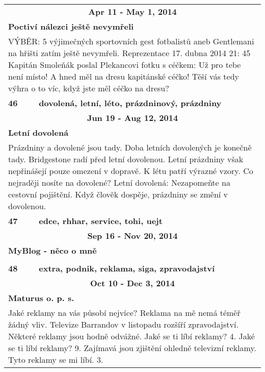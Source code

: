 \begin{tabularx}{\linewidth}{l l}
                \multicolumn{2}{c}{\bf Apr 11 - May 1, 2014} \\
                \multicolumn{2}{p{\linewidth}}{\bf Poctiví nálezci ještě nevymřeli} \\
                \multicolumn{2}{p{\linewidth}}{VÝBĚR: 5 výjimečných sportovních gest fotbalistů aneb Gentlemani na hřišti zatím ještě nevymřeli. Reprezentace 17. dubna 2014 21: 45 Kapitán Smoleňák poslal Plekancovi fotku s céčkem: Už pro tebe není místo! A hned měl na dresu kapitánské céčko! Těší vás tedy výhra o to víc, když jste měl céčko na dresu?} \\ \midrule
                [1.5pt]

            \bf 46 & \bf dovolená, letní, léto, prázdninový, prázdniny \\ \midrule
            
                \multicolumn{2}{c}{\bf Jun 19 - Aug 12, 2014} \\
                \multicolumn{2}{p{\linewidth}}{\bf Letní dovolená} \\
                \multicolumn{2}{p{\linewidth}}{Prázdniny a dovolené jsou tady. Doba letních dovolených je konečně tady. Bridgestone radí před letní dovolenou. Letní prázdniny však nepřinášejí pouze omezení v dopravě. K létu patří výrazné vzory. Co nejraději nosíte na dovolené? Letní dovolená: Nezapomeňte na cestovní pojištění. Když člověk dospěje, prázdniny se změní v dovolenou.} \\ \midrule
                [1.5pt]

            \bf 47 & \bf edce, rhhar, service, tohi, uejt \\ \midrule
            
                \multicolumn{2}{c}{\bf Sep 16 - Nov 20, 2014} \\
                \multicolumn{2}{p{\linewidth}}{\bf MyBlog - něco o mně} \\
                \multicolumn{2}{p{\linewidth}}{} \\ \midrule
                [1.5pt]

            \bf 48 & \bf extra, podnik, reklama, siga, zpravodajství \\ \midrule
            
                \multicolumn{2}{c}{\bf Oct 10 - Dec 3, 2014} \\
                \multicolumn{2}{p{\linewidth}}{\bf Maturus o. p. s.} \\
                \multicolumn{2}{p{\linewidth}}{Jaké reklamy na vás působí nejvíce? Reklama na mě nemá téměř žádný vliv. Televize Barrandov v listopadu rozšíří zpravodajství. Některé reklamy jsou hodně odvážné. Jaké se ti líbí reklamy? 4. Jaké se ti líbí reklamy? 9. Zajímavá jsou zjištění ohledně televizní reklamy. Tyto reklamy se mi líbí. 3.} \\ \midrule
                [1.5pt]


\end{tabularx}
